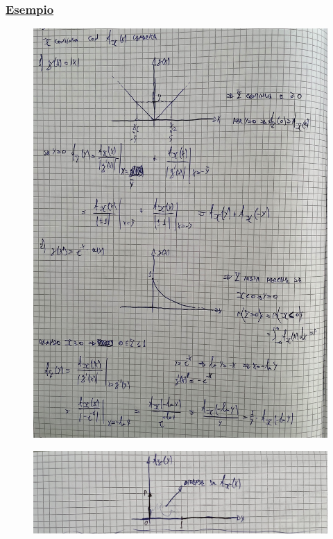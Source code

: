 \documentclass{article}
\begin{document}
\subsubsection{\underline{Esempio}}
\begin{figure}[H]
\centering
\includegraphics[scale=0.10]{ese/27.jpeg}
\end{figure}
\begin{figure}[H]
\centering
\includegraphics[scale=0.10]{ese/27a.jpeg}
\end{figure}
\end{document}
